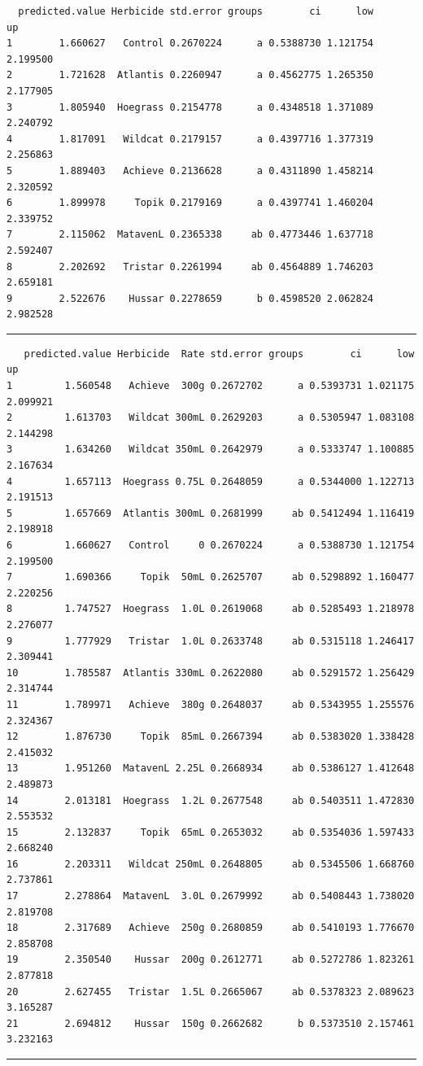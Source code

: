 \documentclass[a4paper, 10pt, fleqn, twosided]{memoir}
\begin{document}
\begin{tcolorbox}[title = Example 7 Tukey's multiple comparison output]
\begin{verbatim}
  predicted.value Herbicide std.error groups        ci      low       up
1        1.660627   Control 0.2670224      a 0.5388730 1.121754 2.199500
2        1.721628  Atlantis 0.2260947      a 0.4562775 1.265350 2.177905
3        1.805940  Hoegrass 0.2154778      a 0.4348518 1.371089 2.240792
4        1.817091   Wildcat 0.2179157      a 0.4397716 1.377319 2.256863
5        1.889403   Achieve 0.2136628      a 0.4311890 1.458214 2.320592
6        1.899978     Topik 0.2179169      a 0.4397741 1.460204 2.339752
7        2.115062  MatavenL 0.2365338     ab 0.4773446 1.637718 2.592407
8        2.202692   Tristar 0.2261994     ab 0.4564889 1.746203 2.659181
9        2.522676    Hussar 0.2278659      b 0.4598520 2.062824 2.982528
\end{verbatim}
{\color{outpt} {\hrule height 1pt}}
\begin{verbatim}
   predicted.value Herbicide  Rate std.error groups        ci      low       up
1         1.560548   Achieve  300g 0.2672702      a 0.5393731 1.021175 2.099921
2         1.613703   Wildcat 300mL 0.2629203      a 0.5305947 1.083108 2.144298
3         1.634260   Wildcat 350mL 0.2642979      a 0.5333747 1.100885 2.167634
4         1.657113  Hoegrass 0.75L 0.2648059      a 0.5344000 1.122713 2.191513
5         1.657669  Atlantis 300mL 0.2681999     ab 0.5412494 1.116419 2.198918
6         1.660627   Control     0 0.2670224      a 0.5388730 1.121754 2.199500
7         1.690366     Topik  50mL 0.2625707     ab 0.5298892 1.160477 2.220256
8         1.747527  Hoegrass  1.0L 0.2619068     ab 0.5285493 1.218978 2.276077
9         1.777929   Tristar  1.0L 0.2633748     ab 0.5315118 1.246417 2.309441
10        1.785587  Atlantis 330mL 0.2622080     ab 0.5291572 1.256429 2.314744
11        1.789971   Achieve  380g 0.2648037     ab 0.5343955 1.255576 2.324367
12        1.876730     Topik  85mL 0.2667394     ab 0.5383020 1.338428 2.415032
13        1.951260  MatavenL 2.25L 0.2668934     ab 0.5386127 1.412648 2.489873
14        2.013181  Hoegrass  1.2L 0.2677548     ab 0.5403511 1.472830 2.553532
15        2.132837     Topik  65mL 0.2653032     ab 0.5354036 1.597433 2.668240
16        2.203311   Wildcat 250mL 0.2648805     ab 0.5345506 1.668760 2.737861
17        2.278864  MatavenL  3.0L 0.2679992     ab 0.5408443 1.738020 2.819708
18        2.317689   Achieve  250g 0.2680859     ab 0.5410193 1.776670 2.858708
19        2.350540    Hussar  200g 0.2612771     ab 0.5272786 1.823261 2.877818
20        2.627455   Tristar  1.5L 0.2665067     ab 0.5378323 2.089623 3.165287
21        2.694812    Hussar  150g 0.2662682      b 0.5373510 2.157461 3.232163
\end{verbatim}
{\color{outpt} {\hrule height 1pt}}
\end{tcolorbox}
\end{document}
